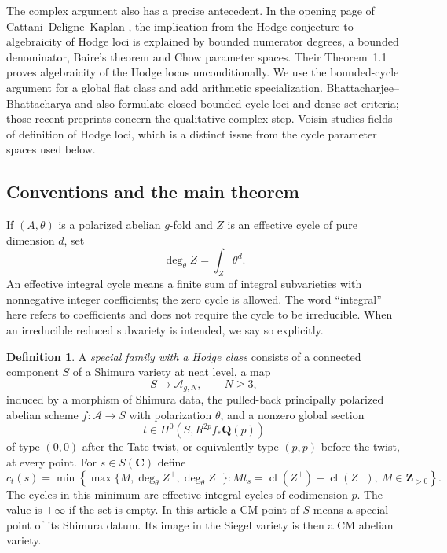 \documentclass[11pt]{article}
\theoremstyle{definition}
\newtheorem{definition}[theorem]{Definition}
\theoremstyle{remark}
\newcommand{\Q}{\mathbf Q}
\newcommand{\Z}{\mathbf Z}
\newcommand{\C}{\mathbf C}
\newcommand{\A}{\mathcal A}
\newcommand{\cl}{\operatorname{cl}}
\begin{document}
The complex argument also has a precise antecedent. In the opening page of Cattani--Deligne--Kaplan \cite[p.~483]{CDK}, the implication from the Hodge conjecture to algebraicity of Hodge loci is explained by bounded numerator degrees, a bounded denominator, Baire's theorem and Chow parameter spaces. Their Theorem~1.1 proves algebraicity of the Hodge locus unconditionally. We use the bounded-cycle argument for a global flat class and add arithmetic specialization. Bhattacharjee--Bhattacharya \cite[Lemmas~4.2--4.3 and Theorem~4.5]{BBDense} and \cite[Theorems~16.9 and 16.17]{BBAlgebraic} also formulate closed bounded-cycle loci and dense-set criteria; those recent preprints concern the qualitative complex step. Voisin \cite[Propositions~0.2 and 0.5, Theorem~0.6]{Voisin07} studies fields of definition of Hodge loci, which is a distinct issue from the cycle parameter spaces used below.

\subsection{Conventions and the main theorem}

If $(A,\theta)$ is a polarized abelian $g$-fold and $Z$ is an effective cycle of pure dimension $d$, set
\[
 \deg_\theta Z=\int_Z\theta^d.
\]
An effective integral cycle means a finite sum of integral subvarieties with nonnegative integer coefficients; the zero cycle is allowed. The word ``integral'' here refers to coefficients and does not require the cycle to be irreducible. When an irreducible reduced subvariety is intended, we say so explicitly.

\begin{definition}\label{def:special}
A \emph{special family with a Hodge class} consists of a connected component $S$ of a Shimura variety at neat level, a map
\[
 S\longrightarrow\mathcal A_{g,N},\qquad N\geq3,
\]
induced by a morphism of Shimura data, the pulled-back principally polarized abelian scheme $f:\A\to S$ with polarization $\theta$, and a nonzero global section
\[
 t\in H^0(S,R^{2p}f_*\Q(p))
\]
of type $(0,0)$ after the Tate twist, or equivalently type $(p,p)$ before the twist, at every point. For $s\in S(\C)$ define
\[
 c_t(s)=\min\left\{\max\{M,\deg_\theta Z^+,\deg_\theta Z^-\}:
 M t_s=\cl(Z^+)-\cl(Z^-),\ M\in\Z_{>0}\right\}.
\]
The cycles in this minimum are effective integral cycles of codimension $p$. The value is $+\infty$ if the set is empty. In this article a CM point of $S$ means a special point of its Shimura datum. Its image in the Siegel variety is then a CM abelian variety.
\end{definition}
\end{document}
